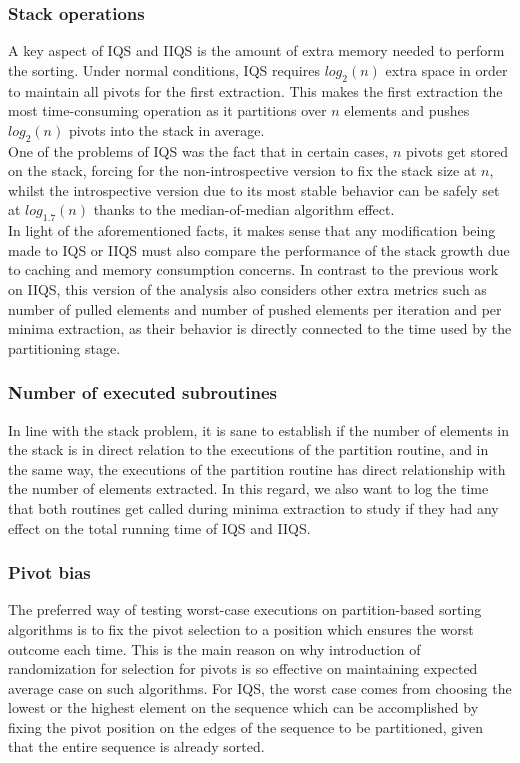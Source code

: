 \subsubsection{Stack operations}
A key aspect of IQS and IIQS is the amount of extra memory needed to perform the sorting. Under normal conditions, IQS requires $log_2(n)$ extra space in order to maintain all pivots for the first extraction. This makes the first extraction the most time-consuming operation as it partitions over $n$ elements and pushes $log_2(n)$ pivots into the stack in average.\\

One of the problems of IQS was the fact that in certain cases, $n$ pivots get stored on the stack, forcing for the non-introspective version to fix the stack size at $n$, whilst the introspective version due to its most stable behavior can be safely set at $log_{1.7}(n)$ thanks to the median-of-median algorithm effect.\\

In light of the aforementioned facts, it makes sense that any modification being made to IQS or IIQS must also compare the performance of the stack growth due to caching and memory consumption concerns. In contrast to the previous work on IIQS, this version of the analysis also considers other extra metrics such as number of pulled elements and number of pushed elements per iteration and per minima extraction, as their behavior is directly connected to the time used by the partitioning stage.\\

\subsubsection{Number of executed subroutines}
In line with the stack problem, it is sane to establish if the number of elements in the stack is in direct relation to the executions of the partition routine, and in the same way, the executions of the partition routine has direct relationship with the number of elements extracted. In this regard, we also want to log the time that both routines get called during minima extraction to study if they had any effect on the total running time of IQS and IIQS.\\

\subsubsection{Pivot bias}
The preferred way of testing worst-case executions on partition-based sorting algorithms is to fix the pivot selection to a position which ensures the worst outcome each time. This is the main reason on why introduction of randomization for selection for pivots is so effective on maintaining expected average case on such algorithms. For IQS, the worst case comes from choosing the lowest or the highest element on the sequence which can be accomplished by fixing the pivot position on the edges of the sequence to be partitioned, given that the entire sequence is already sorted.\\


